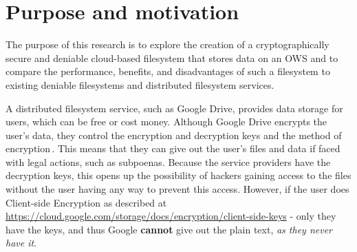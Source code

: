 
\section{Purpose and motivation}

The purpose of this research is to explore the creation of a cryptographically secure and deniable \mbox{cloud-based} filesystem that stores data on an \gls{OWS} and to compare the performance, benefits, and disadvantages of such a filesystem to existing deniable filesystems and distributed filesystem services.

A distributed filesystem service, such as Google Drive, provides data storage for users, which can be free or cost money. Although Google Drive encrypts the user's data, they control the encryption and decryption keys and the method of encryption\,\cite{johnsonGoogleDriveSecure2021}. This means that they can give out the user's files and data if faced with legal actions, such as subpoenas. Because the service providers have the decryption keys, this opens up the possibility of hackers gaining access to the files without the user having any way to prevent this access. However, if the user does Client-side Encryption as described at \url{https://cloud.google.com/storage/docs/encryption/client-side-keys} - only they have the keys, and thus Google \textbf{cannot} give out the plain text, \textit{as they never have it}.


